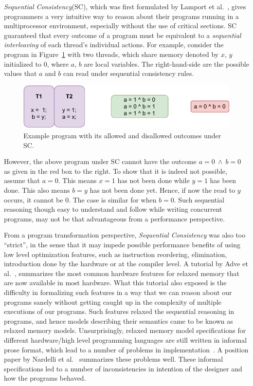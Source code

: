 \textit{Sequential Consistency}(SC), which was first formulated by Lamport et al.~\cite{Lamport79}, gives programmers a very intuitive way to reason about their programs running in a multiprocessor environment, especially without the use of critical sections.
SC guaranteed that every outcome of a program must be equivalent to a \textit{sequential interleaving} of each thread's individual actions. 
For example, consider the program in Figure~\ref{intro:Example} with two threads, which share memory denoted by $x$, $y$ initialized to 0, where $a$, $b$ are local variables. 
The right-hand-side are the possible values that $a$ and $b$ can read under sequential consistency rules.
\begin{figure}[H]
    \centering
    \includegraphics[scale=0.7]{2.Background/SC_Example1(a).pdf}
    \caption{Example program with its allowed and disallowed outcomes under SC.}
    \label{intro:Example}
\end{figure}

However, the above program under SC cannot have the outcome $a=0\ \wedge\ b=0$ as given in the red box to the right. 
To show that it is indeed not possible, assume that $a=0$. This means $x=1$ has not been done while $y=1$ has been done. 
This also means $b=y$ has not been done yet. 
Hence, if now the read to $y$ occurs, it cannot be $0$. The case is similar for when $b=0$. 
Such sequential reasoning though easy to understand and follow while writing concurrent programs, may not be that advantageous from a performance perspective.

From a program transformation perspective, \textit{Sequential Consistency} was also too ``strict'', in the sense that it may impede possible performance benefits of using low level optimization features, such as instruction reordering, elimination, introduction done by the hardware or at the compiler level.
A tutorial by Adve et al.~\cite{AdveG}, summarizes the most common hardware features for relaxed memory that are now available in most hardware. 
What this tutorial also exposed is the difficulty in formalizing such features in a way that we can reason about our programs sanely without getting caught up in the complexity of multiple executions of our programs. 
Such features relaxed the sequential reasoning in programs, and hence models describing their semantics came to be known as relaxed memory models.
Unsurprisingly, relaxed memory model specifications for different hardware/high level programming languages are still written in informal prose format, which lead to a number of problems in implementation~\cite{Sewell}. 
A position paper by Nardelli et al.~\cite{Nardelli} summarizes these problems well.
These informal specifications led to a number of inconsistencies in intention of the designer and how the programs behaved.

